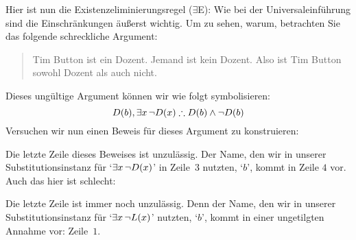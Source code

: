 Hier ist nun die Existenzeliminierungsregel ($\exists$E):
Wie bei der Universaleinführung sind die Einschränkungen äu{\ss}erst wichtig. Um zu sehen, warum, betrachten Sie das folgende schreckliche Argument:
	\begin{quote}
		Tim Button ist ein Dozent. Jemand ist kein Dozent. Also ist Tim Button sowohl Dozent als auch nicht.
	\end{quote}
Dieses ungültige Argument können wir wie folgt symbolisieren:
$$\atom{D}{b}, \exists x\, \enot\atom{D}{x} \therefore \atom{D}{b} \eand \enot \atom{D}{b}$$
Versuchen wir nun einen Beweis für dieses Argument zu konstruieren:
\begin{fitchproof}
	\open	
	\close
\end{fitchproof}
Die letzte Zeile dieses Beweises ist unzulässig. Der Name, den wir in unserer Substitutionsinstanz für `$\exists x\, \neg \mathord{D}(x)$' in Zeile~$3$ nutzten, `$b$', kommt in Zeile $4$ vor. Auch das hier ist schlecht:
\begin{fitchproof}
	\open	
	\close
\end{fitchproof}
Die letzte Zeile ist immer noch unzulässig. Denn der Name, den wir in unserer Substitutionsinstanz für `$\exists x\, \neg \mathord{L}(x)$' nutzten, `$b$', kommt in einer ungetilgten Annahme vor: Zeile~$1$. 

